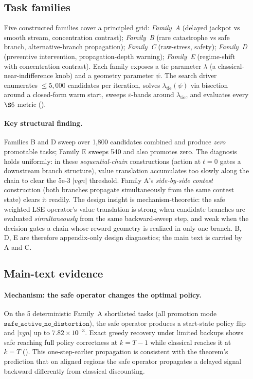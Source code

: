 \subsection{Task families}
\label{ssec:phaseVI_families}

Five constructed families cover a principled grid: \emph{Family~A}
(delayed jackpot vs smooth stream, concentration contrast);
\emph{Family~B} (rare catastrophe vs safe branch, alternative-branch
propagation); \emph{Family~C} (raw-stress, safety);
\emph{Family~D} (preventive intervention, propagation-depth warning);
\emph{Family~E} (regime-shift with concentration contrast). Each family
exposes a tie parameter $\lambda$ (a classical-near-indifference knob)
and a geometry parameter $\psi$. The search driver enumerates
$\le 5{,}000$ candidates per iteration, solves $\lambda_\mathrm{tie}(\psi)$
via bisection around a closed-form warm start, sweeps $\varepsilon$-bands
around $\lambda_\mathrm{tie}$, and evaluates every $\S 6$ metric
().

\paragraph{Key structural finding.} Families B and D sweep over 1,800
candidates combined and produce \emph{zero} promotable tasks; Family E
sweeps 540 and also promotes zero. The diagnosis holds uniformly: in
these \emph{sequential-chain} constructions (action at $t=0$ gates a
downstream branch structure), value translation accumulates too slowly
along the chain to clear the 5e-3 $|vgn|$ threshold. Family A's
\emph{side-by-side contest} construction (both branches propagate
simultaneously from the same contest state) clears it readily. The
design insight is mechanism-theoretic: the safe weighted-LSE operator's
value translation is strong when candidate branches are evaluated
\emph{simultaneously} from the same backward-sweep step, and weak when
the decision gates a chain whose reward geometry is realized in only
one branch. B, D, E are therefore appendix-only design diagnostics; the
main text is carried by A and C.

\subsection{Main-text evidence}
\label{ssec:phaseVI_results}

\paragraph{Mechanism: the safe operator changes the optimal policy.}
On the 5 deterministic Family~A shortlisted tasks (all promotion mode
$\texttt{safe\_active\_no\_distortion}$), the safe operator produces a
start-state policy flip and $|vgn|$ up to $7.82\times 10^{-3}$. Exact
greedy recovery under limited backups shows safe reaching full policy
correctness at $k = T-1$ while classical reaches it at $k = T$
().
This one-step-earlier propagation is consistent with the theorem's
prediction that on aligned regions the safe operator propagates a
delayed signal backward differently from classical discounting.

